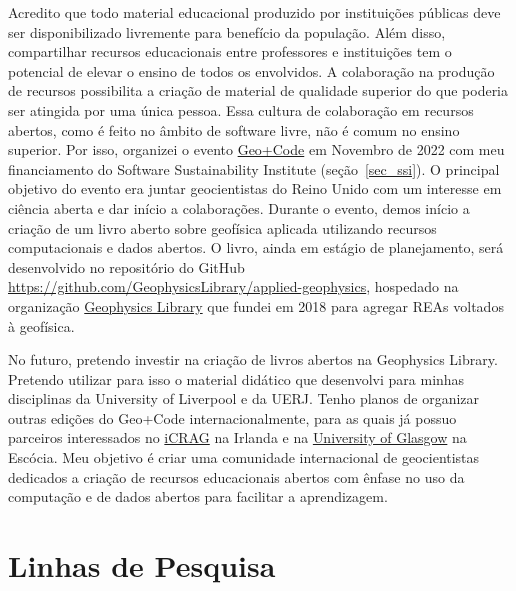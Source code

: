 \documentclass[10pt,a4paper,oneside]{book}
\begin{document}
Acredito que todo material educacional produzido por instituições públicas deve
ser disponibilizado livremente para benefício da população.
Além disso, compartilhar recursos educacionais entre professores e instituições
tem o potencial de elevar o ensino de todos os envolvidos.
A colaboração na produção de recursos possibilita a criação de material de
qualidade superior do que poderia ser atingida por uma única pessoa.
Essa cultura de colaboração em recursos abertos, como é feito no âmbito
de software livre, não é comum no ensino superior.
Por isso, organizei o evento
\href{https://hackmd.io/@leouieda/uk-geo-code-meetup}{Geo+Code} em Novembro de
2022 com meu financiamento do Software Sustainability Institute
(seção~\ref{sec_ssi}).
O principal objetivo do evento era juntar geocientistas do Reino Unido com um
interesse em ciência aberta e dar início a colaborações.
Durante o evento, demos início a criação de um livro aberto sobre geofísica
aplicada utilizando recursos computacionais e dados abertos.
O livro, ainda em estágio de planejamento, será desenvolvido no repositório
do GitHub \url{https://github.com/GeophysicsLibrary/applied-geophysics},
hospedado na organização \href{https://github.com/GeophysicsLibrary}{Geophysics Library}
que fundei em 2018 para agregar REAs voltados à geofísica.

No futuro, pretendo investir na criação de livros abertos na Geophysics
Library.
Pretendo utilizar para isso o material didático que desenvolvi para minhas
disciplinas da University of Liverpool e da UERJ.
Tenho planos de organizar outras edições do Geo+Code internacionalmente,
para as quais já possuo parceiros interessados no
\href{https://www.icrag-centre.org/}{iCRAG} na Irlanda e na
\href{https://www.gla.ac.uk/}{University of Glasgow} na Escócia.
Meu objetivo é criar uma comunidade internacional de geocientistas dedicados a
criação de recursos educacionais abertos com ênfase no uso da computação e de
dados abertos para facilitar a aprendizagem.


\chapter{Linhas de Pesquisa}
\label{cap_pesquisa}
\end{document}
